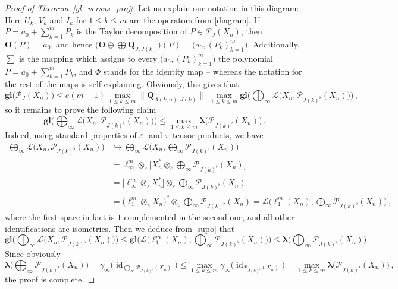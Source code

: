 \documentclass[12pt]{amsart}
\numberwithin{subsection}{section}
\theoremstyle{definition}
\theoremstyle{remark}
\DeclareMathOperator{\id}{\mathrm{id}}
\begin{document}
\begin{proof}[Proof of Theorem~\ref{gl_versus_proj}]
Let us explain our notation in this diagram: Here  $U_k$, $V_k$ and $I_k$ for $1 \leq k \leq m$ are the operators from \eqref{diagram}.
If $P = a_0 +\sum_{k=1}^m P_k$ is the Taylor decomposition of $P \in \mathcal{P}_{J}(X_n)$, then
$\mathbf{O}(P) = a_0$, and hence  $\big(\mathbf{O}\oplus\bigoplus\mathbf{Q}_{J,J(k)}\big)(P) = \big(a_0, (P_k)_{k=1}^m\big)$.
Additionally, $\sum$ is the mapping which assigns to every $\big(a_0, (P_k)_{k=1}^m\big)$ the polynomial $P = a_0 +\sum_{k=1}^m P_k$,
and $\Phi$ stands for the identity map -- whereas the notation for the rest of the maps is self-explaining. Obviously, this gives that
\[
\boldsymbol{g\!l}\big( \mathcal{P}_{J}(X_n)\big)
\le e (m+1) \,\max_{1 \leq  k \leq m}\|\mathbf{Q}_{\Lambda(k,n),J(k)}\|\,\,
\max_{1 \leq  k \leq m} 
\boldsymbol{g\!l}\big( \bigoplus_\infty  \mathcal{L}\big(X_n,\mathcal{P}_{J(k)^\flat}(X_n)\big)\big)\,,
\]
so it remains to prove the following claim
\begin{equation*}
\boldsymbol{g\!l}\big( \bigoplus_\infty  \mathcal{L}\big(X_n,\mathcal{P}_{J(k)^\flat}(X_n)\big)\big)
\leq \max_{1 \leq  k \leq m} \boldsymbol{\lambda}\big( \mathcal{P}_{J(k)^\flat}(X_n)\big)\,.
\end{equation*}
Indeed, using standard properties of $\varepsilon$- and $\pi$-tensor products, we have
\begin{align*}
\bigoplus_\infty  \mathcal{L}\big(X_n,\mathcal{P}_{J(k)^\flat}(X_n)\big)
& \hookrightarrow \bigoplus_\infty  \mathcal{L}\big(X_n,\bigoplus_\infty \mathcal{P}_{J(k)^\flat}(X_n)\big) \\
& = \ell_\infty^m \otimes_\varepsilon \big[ X_n^\ast \otimes_\varepsilon \bigoplus_\infty \mathcal{P}_{J(k)^\flat}(X_n)\big] \\
& = \big[\ell_\infty^m \otimes_\varepsilon  X_n^\ast\big] \otimes_\varepsilon \bigoplus_\infty \mathcal{P}_{J(k)^\flat}(X_n) \\
& = \big(\ell_1^m \otimes_\pi X_n\big)^\ast   \otimes_\varepsilon \bigoplus_\infty \mathcal{P}_{J(k)^\flat}(X_n)
= \mathcal{L}\big(  \ell_1^m(X_n), \bigoplus_\infty \mathcal{P}_{J(k)^\flat}(X_n)\big)\,,
\end{align*}
where the first space in fact is $1$-complemented in the second one, and all other identifications are isometries.
Then we deduce from \eqref{supo} that
\[
\boldsymbol{g\!l}\big( \bigoplus_\infty  \mathcal{L}\big(X_n,\mathcal{P}_{J(k)^\flat}(X_n)\big)\big)
\leq \boldsymbol{g\!l}\big(\mathcal{L}\big(\ell_1^m(X_n), \bigoplus_\infty \mathcal{P}_{J(k)^\flat}(X_n)\big)\big)
\leq \boldsymbol{\lambda} \big(\bigoplus_\infty \mathcal{P}_{J(k)^\flat}(X_n) \big)\,.
\]
Since obviously
\[
\boldsymbol{\lambda} \big(\bigoplus_\infty \mathcal{P}_{J(k)^\flat}(X_n) \big)
= \gamma_\infty \big(\id_{\bigoplus_\infty \mathcal{P}_{J(k)^\flat}(X_n)} \big)
\leq \max_{1 \leq  k \leq m} \gamma_\infty \big(\id_{\mathcal{P}_{J(k)^\flat}(X_n)} \big)
= \max_{1 \leq  k \leq m} \boldsymbol{\lambda} \big(\mathcal{P}_{J(k)^\flat}(X_n) \big)\,,
\]
the proof is complete.
\end{proof}
\end{document}
